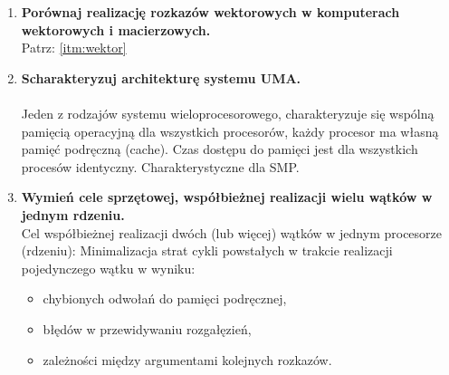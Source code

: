 \begin{enumerate}
			\item \textbf{Porównaj realizację rozkazów wektorowych w komputerach wektorowych i macierzowych.}\\
			Patrz: \ref{itm:wektor}
			
			\item \textbf{Scharakteryzuj architekturę systemu UMA.}\\\\
			Jeden z rodzajów systemu wieloprocesorowego, charakteryzuje się wspólną pamięcią operacyjną dla wszystkich procesorów, każdy procesor ma własną pamięć podręczną (cache). Czas dostępu do pamięci jest dla wszystkich procesów identyczny.  Charakterystyczne dla SMP.
			\item \textbf{Wymień cele sprzętowej, współbieżnej realizacji wielu wątków w jednym rdzeniu.}\\
			Cel współbieżnej realizacji dwóch (lub więcej) wątków w jednym procesorze (rdzeniu): 
			Minimalizacja strat cykli powstałych w trakcie realizacji pojedynczego wątku w wyniku:
			\begin{itemize}
				\item chybionych odwołań do pamięci podręcznej, 
				\item błędów w przewidywaniu rozgałęzień, 
				\item zależności między argumentami kolejnych rozkazów. 
			\end{itemize}
		\end{enumerate}
	
